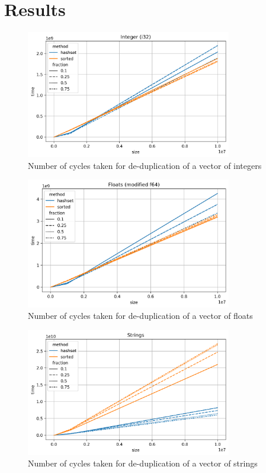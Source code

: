 \section{Results}
\begin{figure}[h]
	\centering
	\includegraphics[width=0.8\textwidth]{graphics/03-int.png}
	\caption{Number of cycles taken for de-duplication of a vector of integers}
\end{figure}

\begin{figure}[h]
	\centering
	\includegraphics[width=0.8\textwidth]{graphics/03-float.png}
	\caption{Number of cycles taken for de-duplication of a vector of floats}
\end{figure}

\newpage

\begin{figure}[h]
	\centering
	\includegraphics[width=0.8\textwidth]{graphics/03-string.png}
	\caption{Number of cycles taken for de-duplication of a vector of strings}
\end{figure}

